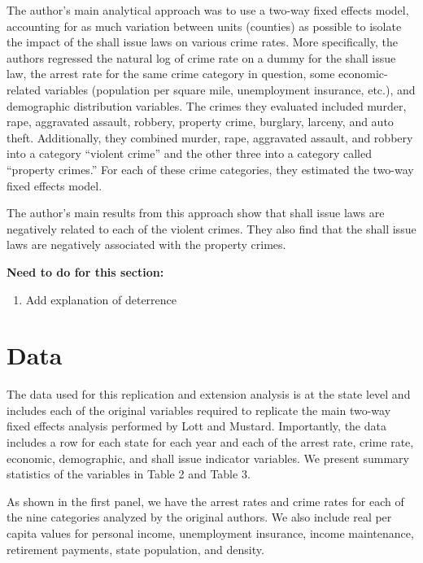\documentclass{article}
\begin{document}


The author's main analytical approach was to use a two-way fixed effects model, accounting for as much variation between units (counties) as possible to isolate the impact of the shall issue laws on various crime rates. More specifically, the authors regressed the natural log of crime rate on a dummy for the shall issue law, the arrest rate for the same crime category in question, some economic-related variables (population per square mile, unemployment insurance, etc.), and demographic distribution variables. The crimes they evaluated included murder, rape, aggravated assault, robbery, property crime, burglary, larceny, and auto theft. Additionally, they combined murder, rape, aggravated assault, and robbery into a category ``violent crime'' and the other three into a category called ``property crimes.'' For each of these crime categories, they estimated the two-way fixed effects model.

The author's main results from this approach show that shall issue laws are negatively related to each of the violent crimes. They also find that the shall issue laws are negatively associated with the property crimes. 

\textbf{Need to do for this section:}
\begin{enumerate}
\item 
Add explanation of deterrence
\end{enumerate}

\section{Data}

The data used for this replication and extension analysis is at the state level and includes each of the original variables required to replicate the main two-way fixed effects analysis performed by Lott and Mustard. Importantly, the data includes a row for each state for each year and each of the arrest rate, crime rate, economic, demographic, and shall issue indicator variables. We present summary statistics of the variables in Table 2 and Table 3. 



As shown in the first panel, we have the arrest rates and crime rates for each of the nine categories analyzed by the original authors. We also include real per capita values for personal income, unemployment insurance, income maintenance, retirement payments, state population, and density.
\end{document}

